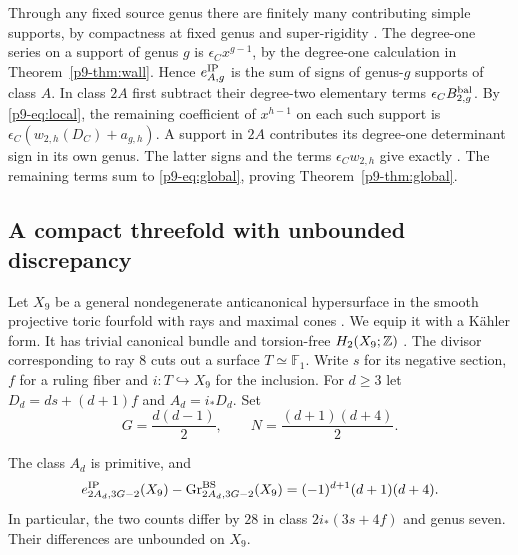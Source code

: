 Through any fixed source genus there are finitely many contributing
simple supports, by compactness at fixed genus and super-rigidity
\cite[\S\S3,5]{bai}. The degree-one series on a support of genus $g$
is $\epsilon_C x^{g-1}$, by the degree-one calculation in
Theorem~\ref{p9-thm:wall}. Hence $e^{\rm IP}_{A,g}$ is the sum of signs
of genus-$g$ supports of class $A$. In class $2A$ first subtract their
degree-two elementary terms $\epsilon_C B_{2,g}^{\rm bal}$. By
\eqref{p9-eq:local}, the remaining coefficient of $x^{h-1}$ on each such
support is $\epsilon_C(w_{2,h}(D_C)+a_{g,h})$. A support in $2A$
contributes its degree-one determinant sign in its own genus. The
latter signs and the terms $\epsilon_C w_{2,h}$ give exactly
\cite[(1.5)]{bai}. The remaining terms sum to \eqref{p9-eq:global},
proving Theorem~\ref{p9-thm:global}.
\subsection{A compact threefold with unbounded discrepancy}\label{p9-sec:example}

Let $X_9$ be a general nondegenerate anticanonical hypersurface in the smooth
projective toric fourfold with rays and maximal cones
\cite[(23)--(24)]{WueCounter}. We equip it with a K\"ahler form.
It has trivial canonical bundle and torsion-free $H_2(X_9;\mathbb Z)$
\cite[\S4.1]{WueCounter}. The divisor corresponding to ray $8$ cuts out
a surface $T\simeq\mathbb F_1$. Write $s$ for its negative section, $f$ for a
ruling fiber and $i:T\hookrightarrow X_9$ for the inclusion. For $d\ge3$ let
$D_d=ds+(d+1)f$ and $A_d=i_*D_d$. Set
\begin{equation}\label{p9-eq:compact-classes}
 G=\frac{d(d-1)}2,\qquad N=\frac{(d+1)(d+4)}2 .
\end{equation}

\begin{corollary}\label{p9-cor:example}
The class $A_d$ is primitive, and
\[
 e^{\rm IP}_{2A_d,3G-2}(X_9)-\operatorname{Gr}^{\rm BS}_{2A_d,3G-2}(X_9)
     =(-1)^{d+1}(d+1)(d+4).
\]
In particular, the two counts differ by $28$ in class $2i_*(3s+4f)$
and genus seven. Their differences are unbounded on $X_9$.
\end{corollary}

